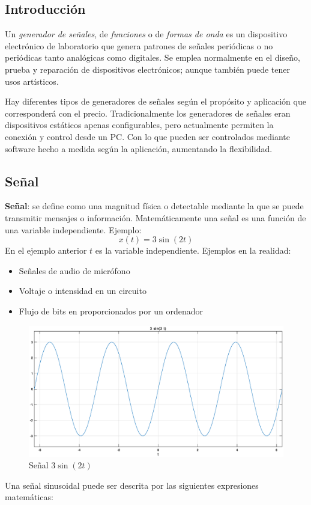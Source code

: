 \documentclass[11pt,a4paper]{article}
\begin{document}
\subsection{Introducción}

Un \emph{generador de señales}, de \emph{funciones} o de
\emph{formas de onda} es un dispositivo electrónico de
laboratorio que genera patrones de señales periódicas o no
periódicas tanto analógicas como digitales. Se emplea
normalmente en el diseño, prueba y reparación de dispositivos
electrónicos; aunque también puede tener usos artísticos.

Hay diferentes tipos de generadores de señales según el
propósito y aplicación que corresponderá con el precio.
Tradicionalmente los generadores de señales eran dispositivos
estáticos apenas configurables, pero actualmente permiten la
conexión y control desde un PC. Con lo que pueden ser
controlados mediante software hecho a medida según la
aplicación, aumentando la flexibilidad. \citep{gdf}

\subsection{Señal}
\textbf{Señal}: se define como una magnitud física o detectable
mediante la que se puede transmitir mensajes o información.
Matemáticamente una señal es una función de una variable
independiente. Ejemplo:
$$x(t) = 3\sin(2t)$$
En el ejemplo anterior $t$ es la variable independiente.
Ejemplos en la realidad:
\begin{itemize}
\item Señales de audio de micrófono
\item Voltaje o intensidad en un circuito
\item Flujo de bits en proporcionados por un ordenador \citep{iss}
\end{itemize}

\begin{figure}[h]
\centering
\includegraphics[scale=0.3]{pics/3sin2t.eps} 
\caption{Señal $3\sin(2t)$}
\end{figure}
\newpage
Una señal sinusoidal puede ser descrita por las siguientes
expresiones matemáticas:
\end{document}
